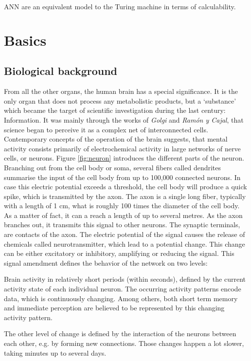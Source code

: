 \documentclass[10pt,a4paper,DIV=11]{scrreprt}
\begin{document}
ANN are an equivalent model to the Turing machine in terms of calculability.\cite{NURING}

\chapter{Basics}
\section{Biological background}
From all the other organs, the human brain has a special significance. It is the only organ that does not process any metabolistic products, but a ‘substance’ which became the target of scientific investigation during the last century: Information. It was mainly through the works of \textit{Golgi} and \textit{Ramón y Cajal}, that science began to perceive it as a complex net of interconnected cells.  Contemporary concepts of the operation of the brain suggests, that mental activity consists primarily of electrochemical activity in large networks of nerve cells, or neurons. 
Figure \ref{fig:neuron} introduces the different parts of the neuron. Branching out from the cell body or soma, several fibers called dendrites summarise the input of the cell body from up to 100,000 connected neurons. In case this electric potential exceeds a threshold, the cell body will produce a quick spike, which is transmitted by the axon. The axon is a single long fiber, typically with a length of 1 cm, what is roughly 100 times the diameter of the cell body. As a matter of fact, it can a reach a length of up to several metres. As the axon branches out, it transmits this signal to other neurons. The synaptic terminals, are contacts of the axon. The electric potential of the signal causes the release of chemicals called neurotransmitter, which lead to a potential change. This change can be either excitatory or inhibitory, amplifying or reducing the signal. This signal amendment defines the behavior of the network on two levels: 

Brain activity in relatively short periods (within seconds), defined by the current activity state of each individual neuron. The occurring activity patterns encode data, which is continuously changing. Among others, both short term memory and immediate perception are believed to be represented by this changing activity pattern.

The other level of change is defined by the interaction of the neurons between each other, e.g. by forming new connections. Those changes happen a lot slower, taking minutes up to several days.\cite{NEUINF} 
\end{document}
